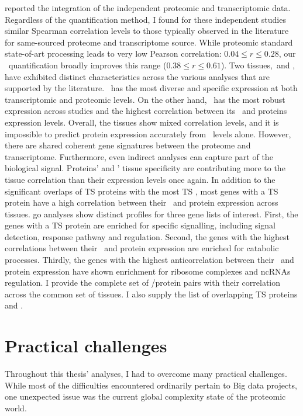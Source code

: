  reported
the integration of the independent proteomic and transcriptomic data.
Regardless of the quantification method,
I found for these independent studies
similar Spearman correlation levels
to those typically observed in the literature
for same-sourced proteome and transcriptome source.
While proteomic standard state-of-art processing leads
to very low Pearson correlation: $0.04 ≤ r ≤ 0.28$,
our \PPKM\ quantification broadly improves this range ($0.38 ≤ r ≤ 0.61$).
Two tissues,\Testis\ and \Liver,
have exhibited distinct characteristics across the various analyses
that are supported by the literature.
\Testis\ has the most diverse and specific expression
at both transcriptomic and proteomic levels.
On the other hand, \Liver\ has the most robust expression across studies
and the highest correlation between its \mRNAs\ and proteins expression levels.
Overall, the tissues show mixed correlation levels,
and it is impossible to predict protein expression accurately
from \mRNA\ levels alone.
However, there are shared coherent gene signatures
between the proteome and transcriptome.
Furthermore, even indirect analyses can capture part of the biological signal.
Proteins' and \mRNAs{}' tissue specificity are contributing
more to the tissue correlation than their expression levels once again.
In addition to the significant overlaps of \gls{TS} proteins
with the most \gls{TS} \mRNAs,
most genes with a \gls{TS} protein have
a high correlation between their \mRNA\ and protein expression across tissues.
\gls{go} analyses show distinct profiles for three gene lists of interest.
First, the genes with a \gls{TS} protein
are enriched for specific signalling,
including signal detection, response pathway and regulation.
Second, the genes with the highest correlations
between their \mRNA\ and protein expression
are enriched for catabolic processes.
Thirdly, the genes with the highest anticorrelation
between their \mRNA\ and protein expression
have shown enrichment for ribosome complexes and \glspl{ncRNA} regulation.
I provide the complete set of \mRNA/protein pairs with their correlation
across the common set of tissues.
I also supply the list of overlapping \gls{TS} proteins and \mRNAs{}.\mybr\

\vspace{-3mm}
\section*{Practical challenges}
\vspace{-4mm}
Throughout this thesis' analyses,
I had to overcome many practical challenges.
While most of the difficulties encountered ordinarily pertain to Big data projects,
one unexpected issue was
the current global complexity state of the proteomic world.


